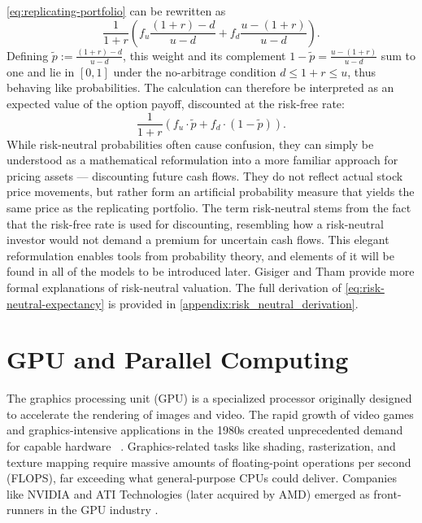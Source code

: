 \documentclass[english,12pt,a4paper,pdftex,sci,utf8]{aaltothesis}
\begin{document}
\cref{eq:replicating-portfolio} can be rewritten as
\begin{equation*}
     \frac{1}{1+r}\left(f_u\frac{(1+r)-d}{u-d}+f_d\frac{u-(1+r)}{u-d}\right).
\end{equation*}
Defining $\tilde{p} := \frac{(1+r)-d}{u-d}$, this weight and its complement $1-\tilde{p} = \frac{u-(1+r)}{u-d}$ sum to one and lie in $[0,1]$ under the no-arbitrage condition $d \leq 1+r \leq u$, thus behaving like probabilities. The calculation can therefore be interpreted as an expected value of the option payoff, discounted at the risk-free rate:
\begin{equation}
     \frac{1}{1+r}(f_u\cdot \tilde p + f_d \cdot (1-\tilde p)).
\label{eq:risk-neutral-expectancy}
\end{equation}
While risk-neutral probabilities often cause confusion, they can simply be understood as a mathematical reformulation into a more familiar approach for pricing assets --- discounting future cash flows. They do not reflect actual stock price movements, but rather form an artificial probability measure that yields the same price as the replicating portfolio. The term risk-neutral stems from the fact that the risk-free rate is used for discounting, resembling how a risk-neutral investor would not demand a premium for uncertain cash flows. This elegant reformulation enables tools from probability theory, and elements of it will be found in all of the models to be introduced later. Gisiger \cite{gisiger2010risk} and Tham \cite{tham2001risk} provide more formal explanations of risk-neutral valuation. The full derivation of \cref{eq:risk-neutral-expectancy} is provided in \cref{appendix:risk_neutral_derivation}.

\clearpage

\section{GPU and Parallel Computing}\label{sec:gpu}

The graphics processing unit (GPU) is a specialized processor originally designed to accelerate the rendering of images and video. The rapid growth of video games and graphics-intensive applications in the 1980s created unprecedented demand for capable hardware ~\cite{sanders2010cuda, kirk2016programming}. Graphics-related tasks like shading, rasterization, and texture mapping require massive amounts of floating-point operations per second (FLOPS), far exceeding what general-purpose CPUs could deliver. Companies like NVIDIA and ATI Technologies (later acquired by AMD) emerged as front-runners in the GPU industry \cite{sanders2010cuda}.
\end{document}
